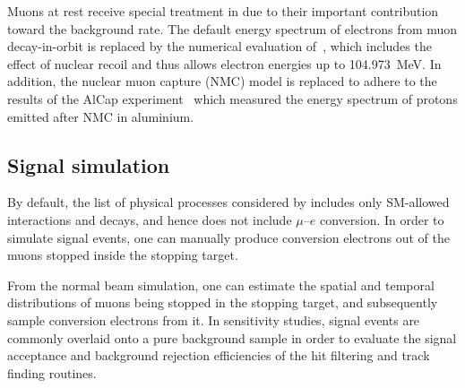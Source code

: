 Muons at rest receive special treatment in \SimG due to their important
contribution toward the background rate. The default energy spectrum of
electrons from muon decay-in-orbit is replaced by the numerical evaluation
of~\cite{czarnecki}, which includes the effect of nuclear recoil and thus allows
electron energies up to \SI{104.973}{\MeV}. In addition, the nuclear muon
capture (NMC) model is replaced to adhere to the results of the AlCap
experiment~\cite{PhysRevC.105.035501} which measured the energy spectrum of
protons emitted after NMC in aluminium.




\subsection{Signal simulation}
By default, the list of physical processes considered by \SimG includes only
SM-allowed interactions and decays, and hence does not include $\mu$--$e$
conversion. In order to simulate signal events, one can manually produce
conversion electrons out of the muons stopped inside the stopping target.

From the normal beam simulation, one can estimate the spatial and temporal
distributions of muons being stopped in the stopping target, and subsequently
sample conversion electrons from it. In sensitivity studies, signal events are
commonly overlaid onto a pure background sample in order to evaluate the signal
acceptance and background rejection efficiencies of the hit filtering and track
finding routines. %

    

